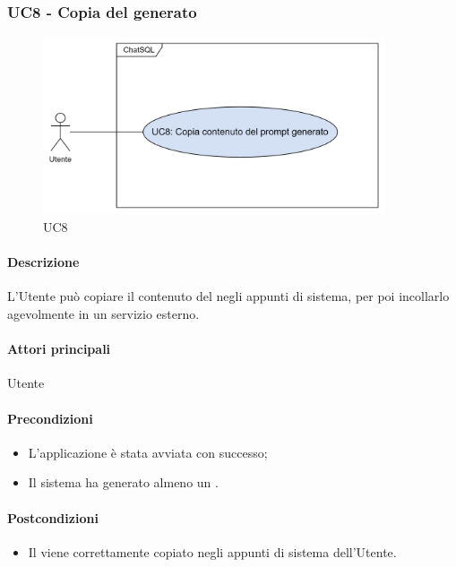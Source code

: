 \subsubsection{UC8 - Copia del  generato}\label{UC8}

\begin{figure}[H]
  \centering
  \includegraphics[width=0.90\textwidth]{assets/uc8.png}
  \caption{UC8}
\end{figure}

\paragraph*{Descrizione}
L'Utente può copiare il contenuto del  negli appunti di sistema, per poi incollarlo agevolmente in un servizio esterno.

\paragraph*{Attori principali}
Utente

\paragraph*{Precondizioni}
\begin{itemize}
  \item L'applicazione è stata avviata con successo;
  \item Il sistema ha generato almeno un .  
\end{itemize}

\paragraph*{Postcondizioni}
\begin{itemize}
  \item Il  viene correttamente copiato negli appunti di sistema dell'Utente.
\end{itemize}

